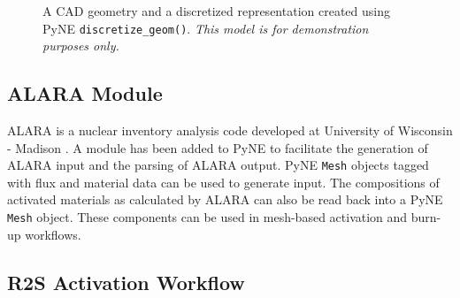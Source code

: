 \documentclass{anstrans}
\begin{document}
\begin{figure}
\centering
{}
\caption{A CAD geometry and a
discretized representation created using PyNE \texttt{discretize\_geom()}.
\textit{This model is for demonstration purposes only.}}
\label{mobius}
\end{figure}


\subsection{ALARA Module}

ALARA is a nuclear inventory analysis code developed at University of Wisconsin
- Madison \cite{wilson_validation_1998}. A module has been added to PyNE to facilitate
the generation of
  ALARA input and the parsing of ALARA output. PyNE
\texttt{Mesh} objects tagged with flux and material data can be used to generate
input. The compositions of activated materials as calculated by
ALARA can also be read back into a PyNE \texttt{Mesh} object. These components can be used
in mesh-based activation and burn-up workflows.

\subsection{R2S Activation Workflow}
\end{document}
